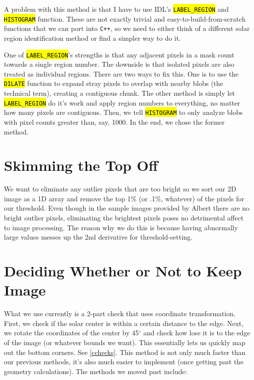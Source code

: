 \documentclass[10pt]{scrartcl}
\begin{document}
A problem with this method is that I have to use IDL's \hl{\texttt{LABEL\_REGION}} and \hl{\texttt{HISTOGRAM}} function. These are not exactly trivial and easy-to-build-from-scratch functions that we can port into \texttt{C++}, so we need to either think of a different solar region identification method or find a simpler way to do it. 

One of \hl{\texttt{LABEL\_REGION}}'s strengths is that any adjacent pixels in a mask count towards a single region number. The downside is that isolated pixels are also treated as individual regions. There are two ways to fix this. One is to use the \hl{\texttt{DILATE}} function to expand stray pixels to overlap with nearby blobs (the technical term), creating a contiguous chunk. The other method is simply let \hl{\texttt{LABEL\_REGION}} do it's work and apply region numbers to everything, no matter how many pixels are contiguous. Then, we tell \hl{\texttt{HISTOGRAM}} to only analyze blobs with pixel counts greater than, say, 1000. In the end, we chose the former method.


\clearpage

\section{Skimming the Top Off} %
\label{sec:skimming_the_top_off}
We want to eliminate any outlier pixels that are too bright so we sort our 2D image as a 1D array and remove the top 1\% (or .1\%, whatever) of the pixels for our threshold. Even though in the sample images provided by Albert there are no bright outlier pixels, eliminating the brightest pixels poses no detrimental affect to image processing. The reason why we do this is because having abnormally large values messes up the 2nd derivative for threshold-setting.

\section{Deciding Whether or Not to Keep Image} %
\label{sec:deciding_whether_or_not_to_keep_image}
What we use currently is a 2-part check that uses coordinate transformation. First, we check if the solar center is within a certain distance to the edge. Next, we rotate the coordinates of the center by 45$^\circ$ and check how lose it is to the edge of the image (or whatever bounds we want). This essentially lets us quickly map out the bottom corners. See \cref{cchecks}. This method is not only much faster than our previous methods, it's also much easier to implement (once getting past the geometry calculations). The methods we moved past include: 
\end{document}
